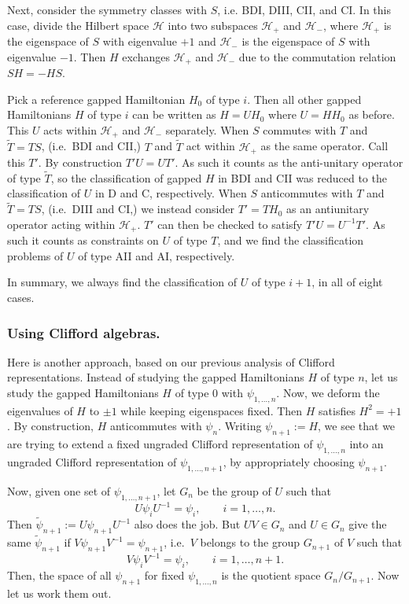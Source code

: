 \documentclass[12pt]{article}
\numberwithin{equation}{section}
\numberwithin{figure}{section}
\theoremstyle{remark}
\def\cH{\mathcal{H}}
\begin{document}
Next, consider the symmetry classes with $S$, i.e. BDI, DIII, CII, and CI.
In this case, divide the Hilbert space $\cH$ into two subspaces $\cH_+$ and $\cH_-$,
where $\cH_+$ is the eigenspace of $S$ with eigenvalue $+1$ and $\cH_-$ is the eigenspace of $S$ with eigenvalue $-1$.
Then $H$ exchanges $\cH_+$ and $\cH_-$ due to the commutation relation $SH=-HS$.

Pick a reference gapped Hamiltonian $H_0$ of type $i$.
Then all other gapped Hamiltonians $H$ of type $i$ can be written as
$H=UH_0$ where $U=HH_0$ as before. 
This $U$ acts within $\cH_+$ and $\cH_-$ separately.
When $S$ commutes with $T$ and $\tilde T=TS$, (i.e.~BDI and CII,)
$T$ and $\tilde T$ act within $\cH_+$ as the same operator.
Call this $T'$. By construction $T'U=UT'$.
As such it counts as the anti-unitary operator of type $\tilde T$,
so the classification of gapped $H$ in BDI and CII was reduced to the 
classification of $U$ in D and C, respectively.
When $S$ anticommutes with $T$ and $\tilde T=TS$, (i.e.~DIII and CI,)
we instead consider $T'=TH_0$ as an antiunitary operator acting within $\cH_+$.
$T'$ can then be checked to satisfy $T'U=U^{-1}T'$. 
As such it counts as constraints on $U$ of type $T$, and 
we find the classification problems of $U$ of type AII and AI, respectively.

In summary, we always find the classification of $U$ of type $i+1$, in all of eight cases.

\subsubsection{Using Clifford algebras.}
Here is another approach, based on our previous analysis of Clifford representations.
Instead of studying the gapped Hamiltonians $H$ of type $n$, 
let us study the gapped Hamiltonians $H$ 
of type $0$ with $\psi_{1,\ldots,n}$.
Now, we deform the eigenvalues of $H$ to $\pm1$ while keeping eigenspaces fixed.
Then $H$ satisfies $H^2=+1$. By construction, $H$ anticommutes with $\psi_n$.
Writing $\psi_{n+1}:=H$, we see that we are trying to extend 
a fixed ungraded Clifford representation of $\psi_{1,\ldots,n}$ into 
an ungraded Clifford representation of $\psi_{1,\ldots,n+1}$,
by appropriately choosing $\psi_{n+1}$.

Now, given one set of $\psi_{1,\ldots,n+1}$, let $G_n$ be the group of $U$ such that
\begin{equation}
U\psi_{i}U^{-1}=\psi_{i},\qquad i=1,\ldots, n.
\end{equation}
Then $\tilde\psi_{n+1}:=U\psi_{n+1}U^{-1}$ also does the job.
But $UV\in G_n$ and $U\in G_n$ give the same $\tilde\psi_{n+1}$ if $V\psi_{n+1} V^{-1}=\psi_{n+1}$,
i.e.~$V$ belongs to the group $G_{n+1}$ of $V$ such that \begin{equation}
V\psi_{i}V^{-1}=\psi_{i},\qquad i=1,\ldots, n+1.
\end{equation}
Then, the space of all $\psi_{n+1}$ for fixed $\psi_{1,\ldots,n}$ is 
the quotient space $G_n/G_{n+1}$.
Now let us work them out.
\end{document}
